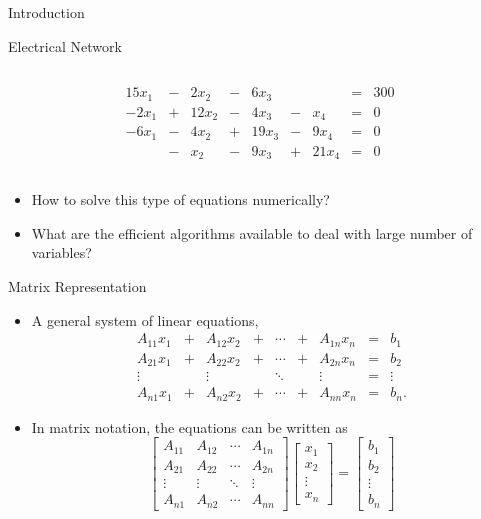 \documentclass{beamer}
\begin{document}
\begin{frame}{Introduction}
\begin{block}{Electrical Network}
\begin{columns}
\begin{column}{0.65\textwidth}
\begin{itemize}
\begin{align*}
15 x_1& -&2 x_2&-&6 x_3 && &=&300\\
-2x_1&+&12x_2&-&4x_3&-&x_4 &=&0\\
-6x_1&-&4x_2&+&19x_3&-&9x_4&=&0\\
&-&x_2&-&9x_3&+&21x_4 &=&0
\end{align*}
\normalsize
\end{itemize}
\end{column}
\end{columns}
\end{block}
\begin{itemize}
\item How to solve this type of equations \alert{numerically}? 
\item What are the \alert{efficient algorithms} available to deal with large number of variables? 
\end{itemize}
\end{frame}
\begin{frame}{Matrix Representation}
\begin{itemize}
\item A general system of linear equations, 
\begin{align*}
A_{11}x_1&+&A_{12}x_2 &+& \cdots & +& A_{1n}x_n&=&b_1\\
A_{21}x_1&+&A_{22}x_2 &+& \cdots & +& A_{2n}x_n&=&b_2\\
\vdots &&\vdots && \ddots & & \vdots &=&\vdots \\
A_{n1}x_1&+&A_{n2}x_2 &+& \cdots & +& A_{nn}x_n&=&b_n.
\end{align*} 
\item In matrix notation, the equations can be written as
\[
\left[ 
\begin{array}{cccc}
A_{11} & A_{12} & \cdots & A_{1n} \\
A_{21} & A_{22} & \cdots & A_{2n} \\
\vdots & \vdots & \ddots & \vdots \\
A_{n1} & A_{n2} & \cdots & A_{nn} 
\end{array}
\right]
\left[
\begin{array}{c}
x_1\\
x_2\\
\vdots\\
x_n
\end{array}
\right]
=
\left[
\begin{array}{c}
b_1\\
b_2\\
\vdots\\
b_n
\end{array}
\right]
\]
\end{itemize}
\end{frame}
\end{document}
